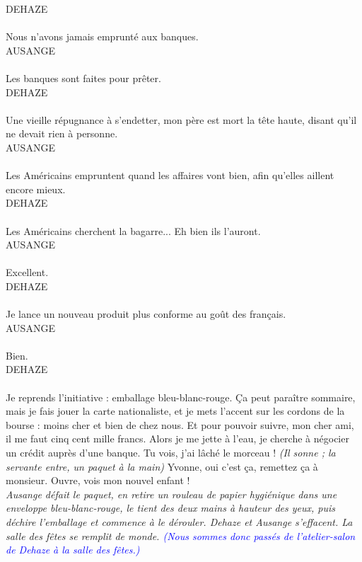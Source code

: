 \documentclass[a4paper]{report}
\newcounter{rem}[chapter]
\newcommand{\annot}[1]{{\footnotesize \textcolor{blue}{\textit{(#1)}}}}
\newcommand{\repl}[2]{\uppercase{#1}\\\\#2\\}
\newcommand{\didas}[1]{\textit{#1}\\}
\begin{document}
\repl{Dehaze}{Nous n'avons jamais emprunté aux banques.}

\repl{Ausange}{Les banques sont faites pour prêter.}

\repl{Dehaze}{Une vieille répugnance à s'endetter, mon père est mort la tête haute, disant qu'il ne devait rien à personne.}

\repl{Ausange}{Les Américains empruntent quand les affaires vont bien, afin qu'elles aillent encore mieux.}

\repl{Dehaze}{Les Américains cherchent la bagarre... Eh bien ils l'auront.}

\repl{Ausange}{Excellent.}

\repl{Dehaze}{Je lance un nouveau produit plus conforme au goût des français.}

\repl{Ausange}{Bien.}

\repl{Dehaze}{Je reprends l'initiative : emballage bleu-blanc-rouge. Ça peut paraître sommaire, mais je fais jouer la carte nationaliste, et je mets l'accent sur les cordons de la bourse : moins cher et bien de chez nous. Et pour pouvoir suivre, mon cher ami, il me faut cinq cent mille francs. Alors je me jette à l'eau, je cherche à négocier un crédit auprès d'une banque. Tu vois, j'ai lâché le morceau ! \textit{(Il sonne ; la servante entre, un paquet à la main)} Yvonne, oui c'est ça, remettez ça à monsieur. Ouvre, vois mon nouvel enfant !}

\didas{Ausange défait le paquet, en retire un rouleau de papier hygiénique dans une enveloppe bleu-blanc-rouge, le tient des deux mains à hauteur des yeux, puis déchire l'emballage et commence à le dérouler. Dehaze et Ausange s'effacent. La salle des fêtes se remplit de monde. \annot{Nous sommes donc passés de l'atelier-salon de Dehaze à la salle des fêtes.}}
\end{document}
